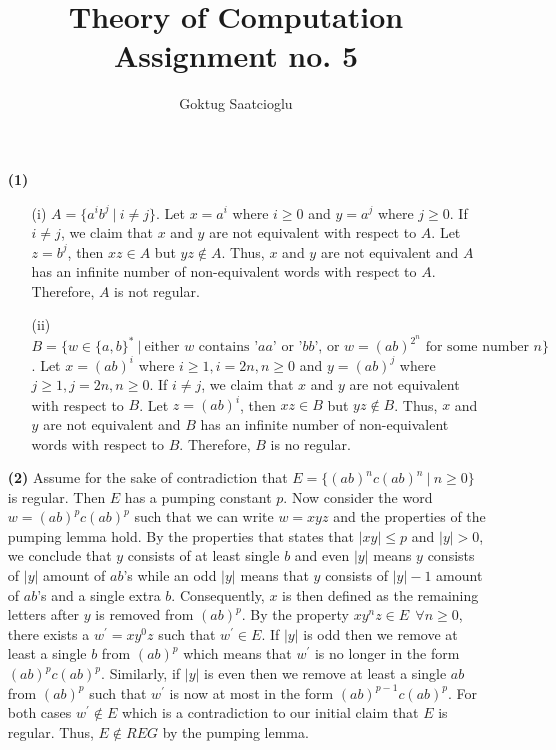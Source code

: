 \documentclass [10pt]{article}
\begin{document}
\title{Theory of Computation Assignment no. 5}
\author{Goktug Saatcioglu}
\date{}
\maketitle

\begin{enumerate}
	\item[\textbf{(1)}]
	\begin{enumerate}
		\item[(i)]$A = \{a^{i}b^{j}\:|\:i \ne j\}$. Let $x = a^{i}$ where $i \ge 0$ and $y = a^{j}$ where $j \ge 0$. If $i \ne j$, we claim that $x$ and $y$ are not equivalent with respect to $A$. Let $z = b^{j}$, then $xz\in A$ but $yz\notin A$. Thus, $x$ and $y$ are not equivalent and $A$ has an infinite number of non-equivalent words with respect to $A$. Therefore, $A$ is not regular.  
		\item[(ii)]$B = \{w\in\{a,b\}^{*}\:|\:\text{either $w$ contains '$aa$' or '$bb$', or $w = (ab)^{2^{n}}$ for some number $n$}\}$. Let $x = (ab)^{i}$ where $i \ge 1, i = 2n, n \ge 0$ and $y = (ab)^{j}$ where $j \ge 1, j = 2n, n \ge 0$. If $i \ne j$, we claim that $x$ and $y$ are not equivalent with respect to $B$. Let $z = (ab)^{i}$, then $xz\in B$ but $yz\notin B$. Thus, $x$ and $y$ are not equivalent and $B$ has an infinite number of non-equivalent words with respect to $B$. Therefore, $B$ is no regular.
	\end{enumerate}
	\item[\textbf{(2)}]Assume for the sake of contradiction that $E = \{(ab)^{n}c(ab)^{n}\:|\:n \ge 0\}$ is regular. Then $E$ has a pumping constant $p$. Now consider the word $w = (ab)^{p}c(ab)^{p}$ such that we can write $w = xyz$ and the properties of the pumping lemma hold. By the properties that states that $\left|xy\right| \le p$ and $\left|y\right| > 0$, we conclude that $y$ consists of at least single $b$ and even $\left|y\right|$ means $y$ consists of $\left|y\right|$ amount of $ab$'s while an odd $\left|y\right|$ means that $y$ consists of $\left|y\right| - 1$ amount of $ab$'s and a single extra $b$. Consequently, $x$ is then defined as the remaining letters after $y$ is removed from $(ab)^{p}$. By the property $xy^{n}z \in E\:\:\forall n \ge 0$, there exists a $w^{\prime} = xy^{0}z$ such that $w^{\prime} \in E$. If $\left|y\right|$ is odd then we remove at least a single $b$ from $(ab)^{p}$ which means that $w^{\prime}$ is no longer in the form $(ab)^{p}c(ab)^{p}$. Similarly, if $\left|y\right|$ is even then we remove at least a single $ab$ from $(ab)^{p}$ such that $w^{\prime}$ is now at most in the form $(ab)^{p-1}c(ab)^{p}$. For both cases $w^{\prime} \notin E$ which is a contradiction to our initial claim that $E$ is regular. Thus, $E \notin REG$ by the pumping lemma.

\end{enumerate}
\end{document}
